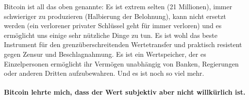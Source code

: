 Bitcoin ist all das oben genannte: Es ist extrem selten (21 Millionen), immer
schwieriger zu produzieren (Halbierung der Belohnung), kann nicht ersetzt werden
(ein verlorener privater Schlüssel geht für immer verloren) und es ermöglicht
uns einige sehr nützliche Dinge zu tun. Es ist wohl das beste Instrument für den
grenzüberschreitenden Wertetransfer und praktisch resistent gegen Zensur und
Beschlagnahmung. Es ist ein Wertspeicher, der es Einzelpersonen ermöglicht ihr
Vermögen unabhängig von Banken, Regierungen oder anderen Dritten aufzubewahren.
Und es ist noch so viel mehr.

\paragraph{Bitcoin lehrte mich, dass der Wert subjektiv aber nicht willkürlich ist.}

%
%
%
%

